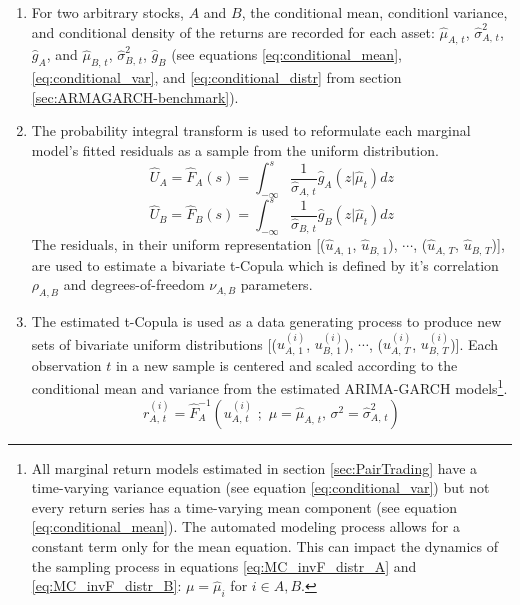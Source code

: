 \documentclass[12pt]{article}
\begin{document}
\begin{enumerate}
    \item For two arbitrary stocks, $A$ and $B$, the conditional mean, conditionl variance, and conditional density of the returns are recorded for each asset: $\hat{\mu}_{A,\,t}$, $\hat{\sigma}^{2}_{A,\,t}$, $\hat{g}_{A}$, and $\hat{\mu}_{B,\,t}$, $\hat{\sigma}^{2}_{B,\,t}$, $\hat{g}_{B}$ (see equations \ref{eq:conditional_mean}, \ref{eq:conditional_var}, and \ref{eq:conditional_distr} from section \ref{sec:ARMAGARCH-benchmark}).
    \item The probability integral transform is used to reformulate each marginal model's fitted residuals as a sample from the uniform distribution.
    \begin{equation} \label{eq:MC_F_distr_A}
        \hat{U}_{A} = \hat{F}_{A}(s) = \int_{-\infty}^{s} \frac{1}{\hat{\sigma}_{A,\,t}} \hat{g}_{A} \left(z | \hat{\mu}_{t}\right) dz
    \end{equation}
    \begin{equation} \label{eq:MC_F_distr_B}
        \hat{U}_{B} = \hat{F}_{B}(s) = \int_{-\infty}^{s} \frac{1}{\hat{\sigma}_{B,\,t}} \hat{g}_{B} \left(z | \hat{\mu}_{t}\right) dz
    \end{equation}
    The residuals, in their uniform representation [($\hat{u}_{A,\,1}$, $\hat{u}_{B,\,1}$), $\cdots$, ($\hat{u}_{A,\,T}$, $\hat{u}_{B,\,T}$)], are used to estimate a bivariate t-Copula which is defined by it's correlation $\rho_{A,B}$ and degrees-of-freedom $\nu_{A,B}$ parameters.
    \item The estimated t-Copula is used as a data generating process to produce new sets of bivariate uniform distributions [($u^{(i)}_{A,\,1}$, $u^{(i)}_{B,\,1}$), $\cdots$, ($u^{(i)}_{A,\,T}$, $u^{(i)}_{B,\,T}$)]. Each observation $t$ in a new sample is centered and scaled according to the conditional mean and variance from the estimated ARIMA-GARCH models\footnote{All marginal return models estimated in section \ref{sec:PairTrading} have a time-varying variance equation (see equation \ref{eq:conditional_var}) but not every return series has a time-varying mean component (see equation \ref{eq:conditional_mean}). The automated modeling process allows for a constant term only for the mean equation. This can impact the dynamics of the sampling process in equations \ref{eq:MC_invF_distr_A} and \ref{eq:MC_invF_distr_B}: $\mu=\hat{\mu}_{i}$ for $i \in {A,B}$.}.
    \begin{equation} \label{eq:MC_invF_distr_A}
        r^{(i)}_{A,\,t} = \hat{F}^{-1}_{A} \left(u^{(i)}_{A,\,t}\,\,;\,\, \mu=\hat{\mu}_{A,\,t},\, \sigma^{2}=\hat{\sigma}^{2}_{A,\,t} \right)

\end{equation}
\end{enumerate}
\end{document}
